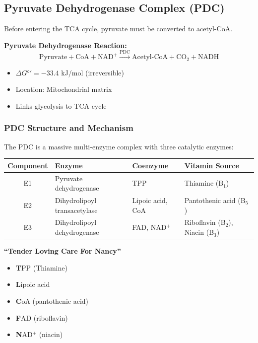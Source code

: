 \subsection{Pyruvate Dehydrogenase Complex (PDC)}

Before entering the TCA cycle, pyruvate must be converted to acetyl-CoA.

\begin{theorem}
\textbf{Pyruvate Dehydrogenase Reaction:}
\[
\text{Pyruvate} + \text{CoA} + \text{NAD}^+ \xrightarrow{\text{PDC}} \text{Acetyl-CoA} + \text{CO}_2 + \text{NADH}
\]

\begin{itemize}
    \item $\Delta G°' = -33.4$ kJ/mol (irreversible)
    \item Location: Mitochondrial matrix
    \item Links glycolysis to TCA cycle
\end{itemize}
\end{theorem}

\subsubsection{PDC Structure and Mechanism}

The PDC is a massive multi-enzyme complex with three catalytic enzymes:

\begin{center}
\begin{tabular}{clll}
\toprule
\textbf{Component} & \textbf{Enzyme} & \textbf{Coenzyme} & \textbf{Vitamin Source} \\
\midrule
E1 & Pyruvate dehydrogenase & TPP & Thiamine (B$_1$) \\
E2 & Dihydrolipoyl transacetylase & Lipoic acid, CoA & Pantothenic acid (B$_5$) \\
E3 & Dihydrolipoyl dehydrogenase & FAD, NAD$^+$ & Riboflavin (B$_2$), Niacin (B$_3$) \\
\bottomrule
\end{tabular}
\end{center}

\begin{tcolorbox}[colback=yellow!10, colframe=yellow!70!black, title=\textbf{Memory Aid: PDC Coenzymes}]
\textbf{``Tender Loving Care For Nancy''}
\begin{itemize}
    \item \textbf{T}PP (Thiamine)
    \item \textbf{L}ipoic acid
    \item \textbf{C}oA (pantothenic acid)
    \item \textbf{F}AD (riboflavin)
    \item \textbf{N}AD$^+$ (niacin)
\end{itemize}
\end{tcolorbox}

